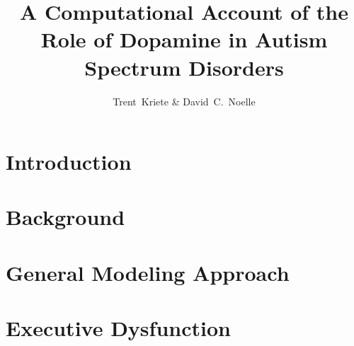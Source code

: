 \documentclass[]{book}
\author{Trent~Kriete \& David~C.~Noelle}\title{A Computational Account of the Role of Dopamine in Autism Spectrum Disorders}
\begin{document}
\frontmatter

%
% 
% 


\mainmatter
\section{Introduction}
\label{section:introduction}




\section{Background}
\label{section:background}




% 
% 


\section{General Modeling Approach}
\label{section:approach}




\section{Executive Dysfunction}
\label{section:executive}


\end{document}
